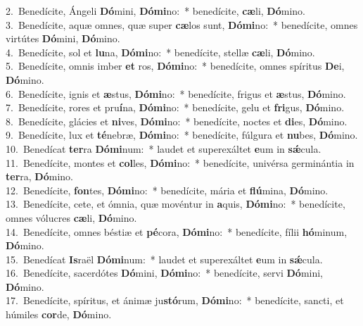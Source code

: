{2.~}Benedícite, Ángeli \textbf{Dó}mini, \textbf{Dó}\textbf{mi}no:~* benedícite, \textbf{cæ}li, \textbf{Dó}mino.\\
{3.~}Benedícite, aquæ omnes, quæ super \textbf{cæ}los sunt, \textbf{Dó}\textbf{mi}no:~* benedícite, omnes virtútes \textbf{Dó}mini, \textbf{Dó}mino.\\
{4.~}Benedícite, sol et \textbf{lu}na, \textbf{Dó}\textbf{mi}no:~* benedícite, stellæ \textbf{cæ}li, \textbf{Dó}mino.\\
{5.~}Benedícite, omnis imber \textbf{et} ros, \textbf{Dó}\textbf{mi}no:~* benedícite, omnes spíritus \textbf{De}i, \textbf{Dó}mino.\\
{6.~}Benedícite, ignis et \textbf{æ}stus, \textbf{Dó}\textbf{mi}no:~* benedícite, frigus et \textbf{æ}stus, \textbf{Dó}mino.\\
{7.~}Benedícite, rores et pru\textbf{í}na, \textbf{Dó}\textbf{mi}no:~* benedícite, gelu et \textbf{fri}gus, \textbf{Dó}mino.\\
{8.~}Benedícite, glácies et \textbf{ni}ves, \textbf{Dó}\textbf{mi}no:~* benedícite, noctes et \textbf{di}es, \textbf{Dó}mino.\\
{9.~}Benedícite, lux et \textbf{té}nebræ, \textbf{Dó}\textbf{mi}no:~* benedícite, fúlgura et \textbf{nu}bes, \textbf{Dó}mino.\\
{10.~}Benedícat \textbf{ter}ra \textbf{Dó}\textbf{mi}num:~* laudet et superexáltet \textbf{e}um in \textbf{sǽ}cula.\\
{11.~}Benedícite, montes et \textbf{col}les, \textbf{Dó}\textbf{mi}no:~* benedícite, univérsa germinántia in \textbf{ter}ra, \textbf{Dó}mino.\\
{12.~}Benedícite, \textbf{fon}tes, \textbf{Dó}\textbf{mi}no:~* benedícite, mária et \textbf{flú}mina, \textbf{Dó}mino.\\
{13.~}Benedícite, cete, et ómnia, quæ movéntur in \textbf{a}quis, \textbf{Dó}\textbf{mi}no:~* benedícite, omnes vólucres \textbf{cæ}li, \textbf{Dó}mino.\\
{14.~}Benedícite, omnes béstiæ et \textbf{pé}cora, \textbf{Dó}\textbf{mi}no:~* benedícite, fílii \textbf{hó}minum, \textbf{Dó}mino.\\
{15.~}Benedícat \textbf{Is}raël \textbf{Dó}\textbf{mi}num:~* laudet et superexáltet \textbf{e}um in \textbf{sǽ}cula.\\
{16.~}Benedícite, sacerdótes \textbf{Dó}mini, \textbf{Dó}\textbf{mi}no:~* benedícite, servi \textbf{Dó}mini, \textbf{Dó}mino.\\
{17.~}Benedícite, spíritus, et ánimæ ju\textbf{stó}rum, \textbf{Dó}\textbf{mi}no:~* benedícite, sancti, et húmiles \textbf{cor}de, \textbf{Dó}mino.\\
